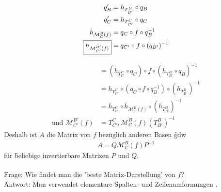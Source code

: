 \begin{align}
q_{B}' &= h_{T_{B'}^{B}} \circ q_{B} \\
q_{C}' &= h_{T_{C'}^{C}} \circ q_{C} \\
h_{\mathcal{M}_{C}^{B}(f)} &= q_{C} \circ f \circ q_{B}^{-1} \\
\fbox{$h_{\mathcal{M}_{C'}^{B'}(f)}$} &= q_{C'} \circ f \circ (q_{B'})^{-1}
\end{align}

\begin{center}
\end{center}
\normalsize

\begin{align}
&= (h_{T_{C'}^{C}} \circ q_C) \circ f \circ (h_{T_{B'}^{B}} \circ q_B)^{-1} \\
&= h_{T_{C'}^{C}} \circ (q_C \circ f \circ q_B^{-1}) \circ (h_{T_{B'}^{B}})^{-1} \\
&= h_{T_{C'}^{C}} \circ h_{\mathcal{M}_{C}^{B}(f)} \circ (h_{T_{B'}^{B}})^{-1} \\
\text{und } \mathcal{M}_{C'}^{B'}(f) &= T_{C'}^{C}, \mathcal{M}_{C}^{B}(f) (T_{B'}^{B})^{-1}
\end{align}
Deshalb ist $A$ die Matrix von $f$ bezüglich anderen Basen \f{gdw} 
\begin{align}
A = Q \mathcal{M}_{C}^{B} (f) P^{-1}
\end{align}
für \f{beliebige} invertierbare Matrizen $P$ und $Q$.\\\\
\f{Frage:} Wie findet man die 'beste Matrix-Darstellung' von $f$? \\
\f{Antwort:} Man verwendet elementare Spalten- und Zeilenumformungen .

